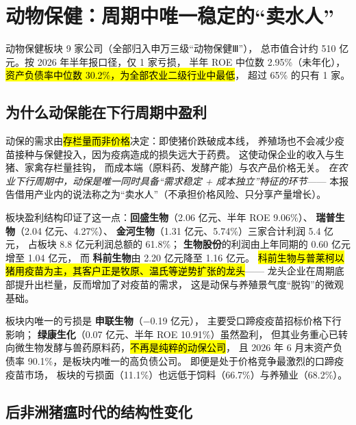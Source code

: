 \section{动物保健：周期中唯一稳定的“卖水人”}
\label{sec:vet}

动物保健板块 \num{9} 家公司（全部归入申万三级“动物保健Ⅲ”），
总市值合计约 \num{510} 亿元。按 2026 年半年报口径，仅 \num{1} 家亏损，
半年 ROE 中位数 \num{2.95}\%（未年化），
\hl{资产负债率中位数 \num{30.2}\%，为全部农业二级行业中最低}，
超过 \num{65}\% 的只有 \num{1} 家。



\subsection{为什么动保能在下行周期中盈利}
\label{sec:vet-mechanism}

动保的需求由\hl{存栏量而非价格}决定：即使猪价跌破成本线，
养殖场也不会减少疫苗接种与保健投入，因为疫病造成的损失远大于药费。
这使动保企业的收入与生猪、家禽存栏量挂钩，
而成本端（原料药、发酵产能）与农产品价格无关。
\emph{在农业下行周期中，动保是唯一同时具备“需求稳定 + 成本独立”特征的环节}——
本报告借用产业内的说法称之为“卖水人”（不承担价格风险、只分享产量增长）。

板块盈利结构印证了这一点：\textbf{回盛生物}（\num{2.06} 亿元、半年 ROE \num{9.06}\%）、
\textbf{瑞普生物}（\num{2.04} 亿元、\num{4.27}\%）、
\textbf{金河生物}（\num{1.31} 亿元、\num{5.74}\%）三家合计利润 \num{5.4} 亿元，
占板块 \num{8.8} 亿元利润总额的 \num{61.8}\%；
\textbf{生物股份}的利润由上年同期的 \num{0.60} 亿元增至 \num{1.04} 亿元，
而 \textbf{科前生物}由 \num{2.20} 亿元降至 \num{1.16} 亿元。
\hl{科前生物与普莱柯以猪用疫苗为主，其客户正是牧原、温氏等逆势扩张的龙头}——
龙头企业在周期底部提升出栏量，反而增加了对疫苗的需求，
这是动保与养殖景气度“脱钩”的微观基础。

板块内唯一的亏损是 \textbf{申联生物}（\num{-0.19} 亿元），
主要受口蹄疫疫苗招标价格下行影响；
\textbf{绿康生化}（\num{0.07} 亿元、半年 ROE \num{10.91}\%）虽然盈利，
但其业务重心已转向微生物发酵与兽药原料药，\hl{不再是纯粹的动保公司}，
且 2026 年 6 月末资产负债率 \num{90.1}\%，是板块内唯一的高负债公司。
即便是处于价格竞争最激烈的口蹄疫疫苗市场，
板块的亏损面（\num{11.1}\%）也远低于饲料（\num{66.7}\%）与养殖业（\num{68.2}\%）。

\subsection{后非洲猪瘟时代的结构性变化}
\label{sec:vet-africa}

